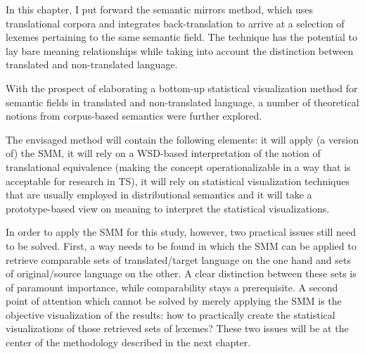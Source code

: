 In this chapter, I put forward the semantic mirrors method, which uses translational corpora and integrates back-translation to arrive at a selection of lexemes pertaining to the same semantic field. The technique has the potential to lay bare meaning relationships while taking into account the distinction between translated and non-translated language.

With the prospect of elaborating a bottom-up statistical visualization method for semantic fields in translated and non-translated language, a number of theoretical notions from corpus-based semantics were further explored.

The envisaged method will contain the following elements: it will apply (a version of) the SMM, it will rely on a WSD-based interpretation of the notion of translational equivalence (making the concept operationalizable in a way that is acceptable for research in TS), it will rely on statistical visualization techniques that are usually employed in distributional semantics and it will take a prototype-based view on meaning to interpret the statistical visualizations.

In order to apply the SMM for this study, however, two practical issues still need to be solved. First, a way needs to be found in which the SMM can be applied to retrieve comparable sets of translated\slash target language on the one hand and sets of original\slash source language on the other. A clear distinction between these sets is of paramount importance, while comparability stays a prerequisite. A second point of attention which cannot be solved by merely applying the SMM is the objective visualization of the results: how to practically create the statistical visualizations of those retrieved sets of lexemes? These two issues will be at the center of the methodology described in the next chapter.
